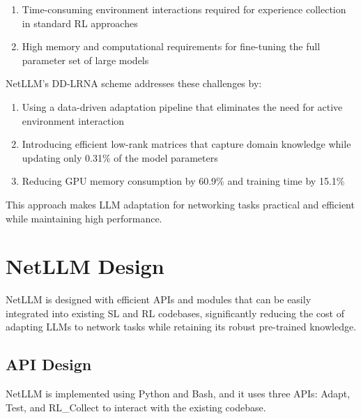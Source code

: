 \documentclass[twocolumn]{article}
\begin{document}
\begin{enumerate}[itemsep=0pt, topsep=2pt, parsep=0pt]
  \item Time-consuming environment interactions required for experience collection in standard RL approaches
  \item High memory and computational requirements for fine-tuning the full parameter set of large models
\end{enumerate}



NetLLM's DD-LRNA scheme addresses these challenges by:
\begin{enumerate}[itemsep=0pt, topsep=2pt, parsep=0pt]
  \item Using a data-driven adaptation pipeline that eliminates the need for active environment interaction
  \item Introducing efficient low-rank matrices that capture domain knowledge while updating only 0.31\% of the model parameters
  \item Reducing GPU memory consumption by 60.9\% and training time by 15.1\%
\end{enumerate}

This approach makes LLM adaptation for networking tasks practical and efficient while maintaining high performance.

\section{NetLLM Design}

NetLLM is designed with efficient APIs and modules that can be easily integrated into existing SL and RL codebases, significantly reducing the cost of adapting LLMs to network tasks while retaining its robust pre-trained knowledge.

\subsection{API Design}
NetLLM is implemented using Python and Bash, and it uses three APIs: Adapt, Test, and RL\_Collect to interact with the existing codebase.
\end{document}
